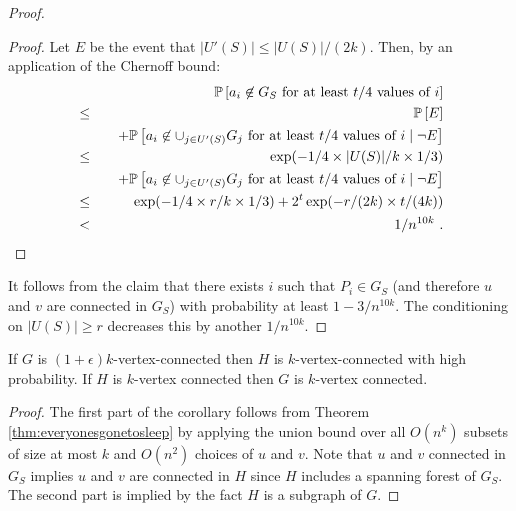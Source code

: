 \begin{proof}
\begin{proof}
Let $E$ be the event that $|U'(S)|\leq |U(S)|/(2k)$. Then, by an application of the Chernoff bound:
\begin{eqnarray*}
& & \mathbb P \left [ a_i\not \in G_S \mbox{ for at least $t/4$ values of $i$} \right ] \\
& \leq &
\mathbb P \left [ E \right ]   \\
& & + \mathbb P \left [ a_i\not \in \cup_{j\in U'(S)}G_j  \mbox{ for at least $t/4$ values of $i$} \mid \neg E \right ] \\
& \leq &
\exp(-1/4 \times |U(S)|/k \times 1/3)   \\
& & \quad + \mathbb P \left [ a_i\not \in \cup_{j\in U'(S)}G_j  \mbox{ for at least $t/4$ values of $i$} \mid \neg E \right ] \\
& \leq &
\exp(-1/4 \times r/k \times 1/3) +2^t \exp(-r/(2k)\times  t/(4k)) \\
&<&  1/n^{10k}\ .
\end{eqnarray*}
\end{proof}
It follows from the claim that there exists $i$ such that $P_i\in G_S$ (and therefore $u$ and $v$ are connected in $G_S$) with probability at least $1-3/n^{10k}$. The conditioning on $|U(S)|\geq r$ decreases this by another $1/n^{10k}$.
\end{proof}

\begin{corollary}
If $G$ is $(1+\epsilon)k$-vertex-connected then $H$ is $k$-vertex-connected with high probability. If $H$ is  $k$-vertex connected then $G$ is $k$-vertex connected.
\end{corollary}
\begin{proof}
The first part of the corollary follows from Theorem \ref{thm:everyonesgonetosleep} by applying the union bound over all $O(n^k)$ subsets of size at most $k$ and $O(n^2)$ choices of $u$ and $v$. Note that $u$ and $v$  connected in $G_S$ implies $u$ and $v$ are connected in $H$ since $H$ includes a spanning forest of $G_S$. The second part  is implied by the fact $H$ is a subgraph of $G$.
\end{proof}

